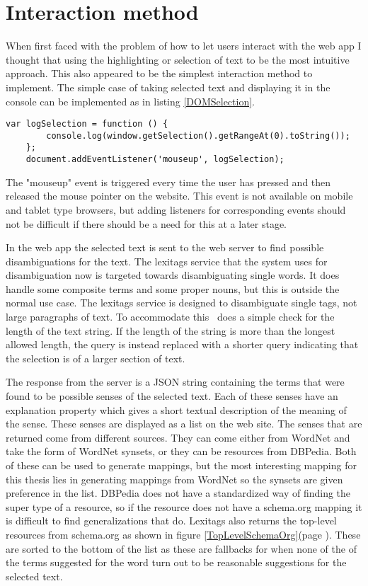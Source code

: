 \section{Interaction method}
\label{Interaction}
When first faced with the problem of how to let users interact with the web app I thought that using the highlighting or
selection of text to be the most intuitive approach.
This also appeared to be the simplest interaction method to implement.
The simple case of taking selected text and displaying it in the console can be implemented as in listing \ref{DOMSelection}.

\begin{lstlisting}[caption={Logging selected text}, label=DOMSelection]
	var logSelection = function () {
		console.log(window.getSelection().getRangeAt(0).toString());
	};
	document.addEventListener('mouseup', logSelection);
\end{lstlisting}

The "mouseup" event is triggered every time the user has pressed and then released the mouse pointer on the website.
This event is not available on mobile and tablet type browsers,
but adding listeners for corresponding events should not be difficult if there should be a need for this at a later stage.

In the web app the selected text is sent to the web server to find possible disambiguations for the text.
The lexitags service that the system uses for disambiguation now is targeted towards disambiguating single words.
It does handle some composite terms and some proper nouns, but this is outside the normal use case.
The lexitags service is designed to disambiguate single tags, not large paragraphs of text.
To accommodate this \theartefact\ does a simple check for the length of the text string.
If the length of the string is more than the longest allowed length,
the query is instead replaced with a shorter query indicating that the selection is of a larger section of text.

The response from the server is a JSON string containing the terms that were found to be possible senses of the selected text.
Each of these senses have an explanation property which gives a short textual description of the meaning of the sense.
These senses are displayed as a list on the web site.
The senses that are returned come from different sources.
They can come either from WordNet and take the form of WordNet synsets, or they can be resources from DBPedia.
Both of these can be used to generate mappings,
but the most interesting mapping for this thesis lies in generating mappings from WordNet so the synsets are given preference in the list.
DBPedia does not have a standardized way of finding the super type of a resource,
so if the resource does not have a schema.org mapping it is difficult to find generalizations that do.
Lexitags also returns the top-level resources from schema.org as shown in figure \ref{TopLevelSchemaOrg}(page \pageref{TopLevelSchemaOrg}).
These are sorted to the bottom of the list as these are fallbacks for when none of the of the terms suggested for
the word turn out to be reasonable suggestions for the selected text.

